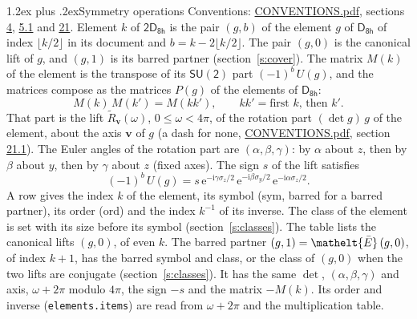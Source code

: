 \documentclass[10pt,a4paper]{article}
\makeatletter
\renewcommand\section{\@startsection{section}{1}{\z@}{-3ex plus -1ex minus -.2ex}%
  {1.2ex plus .2ex}{\normalfont\large\sffamily\bfseries\color{parttitle}}}
\numberwithin{equation}{section}
\newcommand{\eltfont}[1]{{\let\sigma\eltsigma\mathelt{#1}}}
\newcommand{\grp}[1]{\mathsf{#1}}
\newcommand{\elt}[1]{\eltfont{#1}}
\newcommand{\vv}{\mathbf{v}}
\newcommand{\iunit}{\mathrm{i}}
\newcommand{\expe}{\mathrm{e}}
\newcommand{\barred}[1]{\bar{#1}}
\newcommand{\lift}[1]{\tilde{#1}}
\newcommand{\pauli}[1]{\sigma_{#1}}
\makeatother
\begin{document}
\section{Symmetry operations}\label{s:elements}
Conventions: \href{../../CONVENTIONS.pdf}{CONVENTIONS.pdf}, sections \href{../../../rotation/CONVENTIONS.pdf\#conv.4}{4}, \href{../../../rotation/CONVENTIONS.pdf\#conv.5.1}{5.1} and \href{../../CONVENTIONS.pdf\#conv.21}{21}.
\leavevmode\label{n:index.element}\label{n:element.g}Element $k$ of $\grp{2D_{8h}}$ is the pair $(g, b)$ of the element $g$ of \href{../../../rotation/data/pdf/D8h.pdf}{$\grp{D_{8h}}$} of index $\lfloor k/2\rfloor$ in its document and $b = k - 2\lfloor k/2\rfloor$. The pair $(g, 0)$ is the canonical lift of $g$, and $(g, 1)$ is its barred partner (section~\ref{s:cover}). \label{n:matrix.element.pin}\label{n:matrix.element}The matrix $M(k)$ of the element is the transpose of its $\grp{SU(2)}$ part $(-1)^{b}\,U(g)$, and the matrices compose as the matrices $P(g)$ of the elements of $\grp{D_{8h}}$:
\begin{equation}\label{e:mprod}M(k)\,M(k') = M(kk'),\qquad kk' = \text{first } k\text{, then } k'.\end{equation}
\leavevmode\label{n:angle.omega}\label{n:vector.axis}\label{n:vector.pole}That part is the lift $\lift{R}_{\vv}(\omega)$, $0 \le \omega < 4\pi$, of the rotation part $(\det g)\,g$ of the element, about the axis $\vv$ of $g$ (a dash for none, \href{../../CONVENTIONS.pdf}{CONVENTIONS.pdf}, section \href{../../CONVENTIONS.pdf\#conv.21.1}{21.1}). \label{n:angle.euler.alpha}\label{n:angle.euler.beta}\label{n:angle.euler.gamma}\label{n:vector.coordinates}The Euler angles of the rotation part are $(\alpha,\beta,\gamma)$: by $\alpha$ about $z$, then by $\beta$ about $y$, then by $\gamma$ about $z$ (fixed axes). \label{n:local.euler.sign}The sign $s$ of the lift satisfies
\begin{equation}\label{e:euler}(-1)^{b}\,U(g) = s\,\expe^{-\iunit\gamma\pauli{z}/2}\,\expe^{-\iunit\beta\pauli{y}/2}\,\expe^{-\iunit\alpha\pauli{z}/2}.\end{equation}
\leavevmode\label{n:index.element.inverse}\label{n:head.sym}\label{n:head.ord}A row gives the index $k$ of the element, its symbol (sym, barred for a barred partner), its order (ord) and the index $k^{-1}$ of its inverse. \label{n:head.class}The class of the element is set with its size before its symbol (section~\ref{s:classes}).
The table lists the canonical lifts $(g, 0)$, of even $k$. The barred partner $(g, 1) = \elt{\barred{E}}\,(g, 0)$, of index $k + 1$, has the barred symbol and class, or the class of $(g, 0)$ when the two lifts are conjugate (section~\ref{s:classes}). It has the same $\det$, $(\alpha,\beta,\gamma)$ and axis, $\omega + 2\pi$ modulo $4\pi$, the sign $-s$ and the matrix $-M(k)$. Its order and inverse (\texttt{elements.items}) are read from $\omega + 2\pi$ and the multiplication table.
\end{document}
